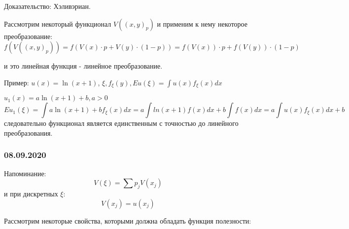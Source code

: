 \documentclass[%
12pt, %
final, %
oneside, %
onecolumn, %
centertags]{article} %
\theoremstyle{plain}
\theoremstyle{definition}
\theoremstyle{remark}
\begin{document}
Доказательство: Хэливэриан.

Рассмотрим некоторый функционал $V((x,y)_p)$ и применим к нему некоторое преобразование:
$$f\left(V((x,y)_p)\right) = f(V(x)\cdot p+V(y)\cdot (1-p)) = f(V(x))\cdot p + f(V(y))\cdot (1-p)$$

и это линейная функция - линейное преобразование.

Пример: $u(x) = \ln (x+1)$, $\xi, f_{\xi}(y), Eu(\xi) = \int\limits u(x)f_{\xi}(x)dx$

$u_1(x) = a\ln(x+1) + b, a>0$
$$Eu_1(\xi) =  \int\limits  a\ln(x+1) + bf_{\xi}(x)dx = a\int ln(x+1)f(x)dx+b\int\limits f(x)dx = a\int\limits u(x)f_{\xi}(x)dx + b$$
следовательно функционал является единственным с точностью до линейного преобразования.

\subsubsection{08.09.2020}

Напоминание:
$$V(\xi) = \sum\limits p_j V(x_j)$$
и при дискретных $\xi$:
$$V(x_j) = u(x_j)$$

Рассмотрим некоторые свойства, которыми должна обладать функция полезности:
\end{document}
